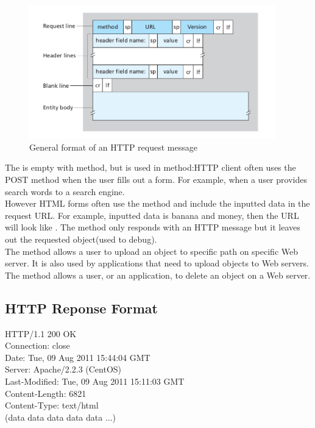 \begin{figure}[!h]
    \includegraphics[width=0.95\textwidth]{chapters/chapter2/HTTP_Format.png}
    \caption{General format of an HTTP request message}
    \label{c2_http_format}
\end{figure}

The  is empty with  method, but is used in  method:HTTP client
often uses the POST method when the user fills out a form. For example, when a
user provides search words to a search engine. \\
However HTML forms often use the  method and include the inputted data in the request URL. For example, inputted data is banana and money,
then the URL will look like .
The  method only responds with an HTTP message but it leaves out the requested object(used to debug).\\
The  method allows a user to upload an object to specific path on specific Web server. It is also used by applications that need to
upload objects to Web servers.\\
The  method allows a user, or an application, to delete an
object on a Web server.


\subsection{HTTP Reponse Format}




\begin{center}
    HTTP/1.1 200 OK\\
    Connection: close\\
    Date: Tue, 09 Aug 2011 15:44:04 GMT\\
    Server: Apache/2.2.3 (CentOS)\\
    Last-Modified: Tue, 09 Aug 2011 15:11:03 GMT\\
    Content-Length: 6821\\
    Content-Type: text/html\\
    (data data data data data ...)
\end{center}


